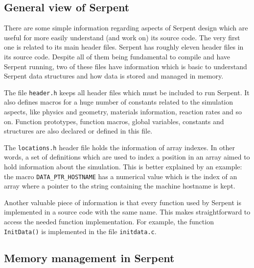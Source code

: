 \documentclass[twoside,a4paper,12pt,english]{anstrans}
\begin{document}
\subsection{General view of Serpent}

There are some simple information regarding aspects of Serpent design which are
useful for more easily understand (and work on) its source code. The very first one is related to its
main header files. Serpent has roughly eleven header files in its source code. Despite all of them
being fundamental to compile and have Serpent running, two of these files have information which
is basic to understand Serpent data structures and how data is stored and managed in memory.

The file \texttt{header.h} keeps all header files which must be included to run Serpent.
It also defines macros for a huge number of constants related to the simulation aspects, like
physics and geometry, materials information, reaction rates and so on. Function prototypes, function
macros, global variables, constants and structures are also declared or defined in this file.

The \texttt{locations.h} header file holds the information of array indexes. In other words, a set of
definitions which are used to index a position in an array aimed to hold information about the simulation.
This is better explained by an example: the macro \texttt{DATA\_PTR\_HOSTNAME} has a numerical value
which is the index of an array where a pointer to the string containing the machine hostname is kept.

Another valuable piece of information is that every function used by Serpent
is implemented in a source code with the same name. This makes straightforward to access the needed
function implementation. For example, the function \texttt{InitData()} is implemented in the file
\texttt{initdata.c}.


%
%
\subsection{Memory management in Serpent}
\end{document}
